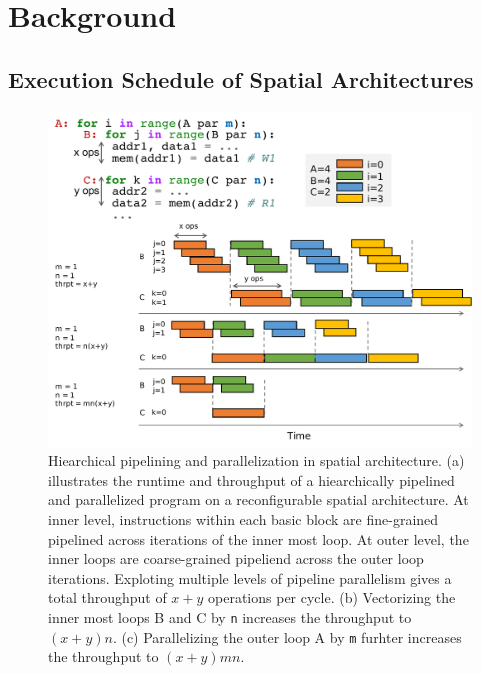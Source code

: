 \chapter{Background}

\section{Execution Schedule of Spatial Architectures} 
\begin{figure}
\centering
\includegraphics[width=1.0\textwidth]{figs/pipeexec.pdf}
\caption[Hiearchical pipelining and parallelization on spatial architecture]{
Hiearchical pipelining and parallelization in spatial architecture.
(a) illustrates the runtime and throughput of a hiearchically pipelined and parallelized program on
a reconfigurable spatial architecture. 
At inner level, instructions within each basic
block are fine-grained pipelined across iterations of the inner most loop. 
At outer level, the inner loops are coarse-grained pipeliend across the outer loop iterations.
Exploting multiple levels of pipeline parallelism gives a total throughput of $x+y$ operations per cycle.
(b) Vectorizing the inner most loops B and C by \texttt{n} increases the throughput to $(x+y)n$.
(c) Parallelizing the outer loop A by \texttt{m} furhter increases the throughput to $(x+y)mn$.
}
\label{fig:pipeexec}
\end{figure}

